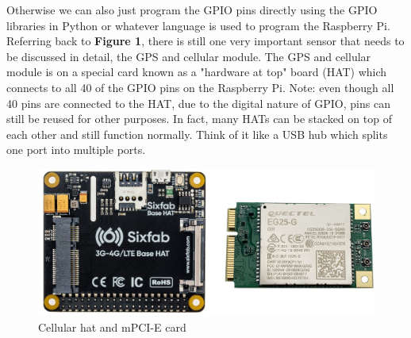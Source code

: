 \documentclass[12pt, letterpaper]{article}
\begin{document}
\par
\newpage




Otherwise we can also just program the GPIO pins directly using the GPIO libraries in Python or whatever language is used to program the Raspberry Pi. Referring back to \textbf{Figure 1}, there is still one very important sensor that needs to be discussed in detail, the GPS and cellular module. The GPS and cellular module is on a special card known as a "hardware at top" board (HAT) which connects to all 40 of the GPIO pins on the Raspberry Pi. Note: even though all 40 pins are connected to the HAT, due to the digital nature of GPIO, pins can still be reused for other purposes. In fact, many HATs can be stacked on top of each other and still function normally. Think of it like a USB hub which splits one port into multiple ports. 

\begin{figure}[h!]
\centering
\includegraphics[width=1\columnwidth]{assets/base-hat-main.jpg}
\caption{Cellular hat and mPCI-E card}
\end{figure}	
\end{document}
